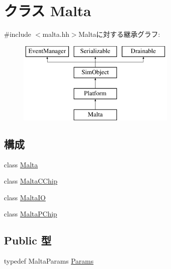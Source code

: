 \hypertarget{classMalta}{
\section{クラス Malta}
\label{classMalta}
}


{\ttfamily \#include $<$malta.hh$>$}Maltaに対する継承グラフ:\begin{figure}[H]
\begin{center}
\leavevmode
\includegraphics[height=4cm]{classMalta}
\end{center}
\end{figure}
\subsection*{構成}
\begin{DoxyCompactItemize}
\item 
class \hyperlink{classMalta_1_1Malta}{Malta}
\item 
class \hyperlink{classMalta_1_1MaltaCChip}{MaltaCChip}
\item 
class \hyperlink{classMalta_1_1MaltaIO}{MaltaIO}
\item 
class \hyperlink{classMalta_1_1MaltaPChip}{MaltaPChip}
\end{DoxyCompactItemize}
\subsection*{Public 型}
\begin{DoxyCompactItemize}
\item 
typedef MaltaParams \hyperlink{classMalta_a189ad6fd96fd77d2ea4e32ba0a9e5298}{Params}
\end{DoxyCompactItemize}
